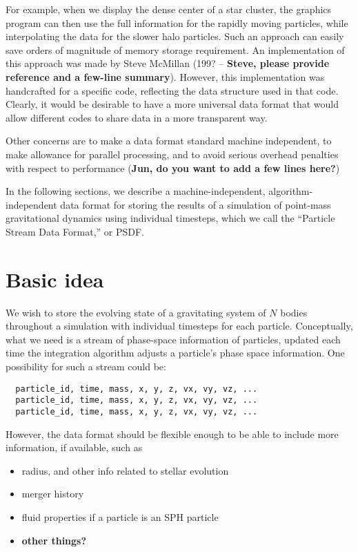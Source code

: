 \documentclass[5p,authoryear]{elsarticle}
\begin{document}
For example, when we display the dense center of a star cluster, the
graphics program can then use the full information for the rapidly
moving particles, while interpolating the data for the slower halo
particles.  Such an approach can easily save orders of magnitude of
memory storage requirement.  An implementation of this approach was
made by Steve McMillan (199? -- {\bf Steve, please provide reference
  and a few-line summary}).  However, this implementation was
handcrafted for a specific code, reflecting the data structure used in
that code.  Clearly, it would be desirable to have a more universal
data format that would allow different codes to share data in a more
transparent way.

Other concerns are to make a data format standard machine independent,
to make allowance for parallel processing, and to avoid serious
overhead penalties with respect to performance ({\bf Jun, do you want
  to add a few lines here?})

In the following sections, we describe a machine-independent,
algorithm-independent data format for storing the results of a
simulation of point-mass gravitational dynamics using individual
timesteps, which we call the ``Particle Stream Data Format,'' or PSDF.

\section{Basic idea}

We wish to store the evolving state of a gravitating system of $N$
bodies throughout a simulation with individual timesteps for each
particle. Conceptually, what we need is a stream of phase-space
information of particles, updated each time the integration algorithm
adjusts a particle's phase space information.  One possibility for
such a stream could be:
\begin{verbatim}
  particle_id, time, mass, x, y, z, vx, vy, vz, ...
  particle_id, time, mass, x, y, z, vx, vy, vz, ...
  particle_id, time, mass, x, y, z, vx, vy, vz, ...
\end{verbatim}
However, the data format should be flexible enough to be able to
include more information, if available, such as
\begin{itemize}
\item radius, and other info related to stellar evolution
\item merger history
\item fluid properties if a particle is an SPH particle
\item {\bf other things?}
\end{itemize}
\end{document}
